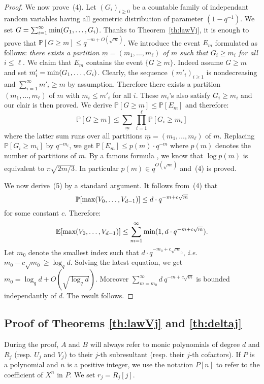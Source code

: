 \documentclass{jT}
\numberwithin{equation}{section}
\theoremstyle{definition}
\renewcommand{\min}{\text{\rm min}}
\renewcommand{\max}{\text{\rm max}}
\renewcommand{\P}{\mathbb P}
\newcommand{\E}{\mathbb E}
\begin{document}
\begin{proof}
We now prove~(4). Let $(G_i)_{i \geq 0}$ be a countable family 
of independant random variables having all geometric distribution of 
parameter $(1 - q^{-1})$. We set $G = \sum_{i=1}^\infty \min(G_1, 
\ldots, G_i)$. Thanks to Theorem~\ref{th:lawVj}, it is enough to prove
that $\P[G \geq m] \leq q^{-m + O(\sqrt m)}$.
We introduce the event $E_m$ formulated as follows:
\emph{there exists a partition $\underline m = 
(m_1, \ldots, m_\ell)$ of $m$ such that 
$G_i \geq m_i$ for all $i \leq \ell$}.
We claim that $E_m$ contains the event $\{ G \geq m\}$. Indeed assume
$G \geq m$ and set $m'_i = \min(G_1, \ldots, G_i)$. Clearly, the 
sequence $(m'_i)_{i \geq 1}$ is nondecreasing and $\sum_{i=1}^\infty 
m'_i \geq m$ by assumption. Therefore there exists a partition 
$(m_1, \ldots, m_\ell)$ of $m$ with $m_i \leq m'_i$ for all $i$.
These $m_i$'s also satisfy $G_i \geq m_i$ and our clair is then proved. 
We derive $\P[G \geq m] \leq \P[E_m]$ and therefore:
$$\P[G \geq m] \leq \sum_{\underline m} \, \prod_{i=1}^\ell \P[G_i \geq m_i]$$
where the latter sum runs over all partitions $\underline m = (m_1, \ldots, m_\ell)$ 
of $m$. Replacing $\P[G_i \geq m_i]$ by $q^{-m_i}$, we get
$\P[E_m] \leq p(m) \cdot q^{-m}$
where $p(m)$ denotes the number of partitions of $m$. By a famous 
formula \cite{andrews}, we know that $\log p(m)$ is equivalent to $\pi 
\sqrt{2m/3}$. In particular $p(m) \in q^{O(\sqrt m)}$ and~(4) is proved.

We now derive~(5) by a standard argument. It follows from~(4) that
$$\P[\max(V_0, \ldots, V_{d-1})] \leq d \cdot q^{-m + c\sqrt m}$$
for some constant $c$. Therefore:
$$\E[\max(V_0, \ldots, V_{d-1})] \leq \sum_{m=1}^\infty \min(1,
d \cdot q^{-m + c\sqrt m}).$$
Let $m_0$ denote the smallest index such that $d \cdot q^{-m_0 + c\sqrt 
m_0}$, \emph{i.e.} $m_0 - c \sqrt{m_0} \geq \log_q d$. Solving the latest
equation, we get $m_0 = \log_q d + O(\sqrt{\log_q d})$. Moreover
$\sum_{m=m_0}^\infty d\: q^{-m + c\sqrt m}$ is bounded independantly of
$d$. The result follows.
\end{proof}

\subsection{Proof of Theorems \ref{th:lawVj} and \ref{th:deltaj}}
\label{subsec:proof}

During the proof, $A$ and $B$ will always refer to monic polynomials of 
degree $d$ and $R_j$ (resp. $U_j$ and $V_j$) to their $j$-th 
subresultant (resp. their $j$-th cofactors). If $P$ is a polynomial and 
$n$ is a positive integer, we use the notation $P[n]$ to refer to the 
coefficient of $X^n$ in $P$. We set $r_j = R_j[j]$.
\end{document}
